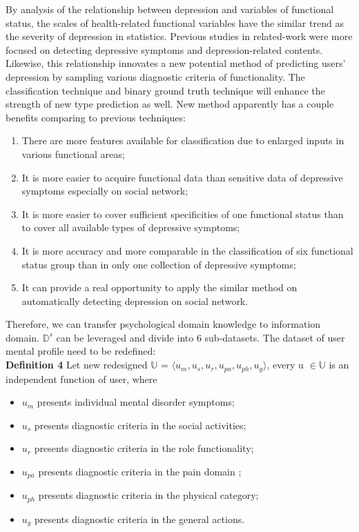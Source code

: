 \documentclass[10pt,journal,compsoc]{IEEEtran}
\begin{document}
By analysis of the relationship between depression and variables of functional status, the scales of health-related functional variables have the similar trend as the severity of depression in statistics. Previous studies in related-work were more focused on detecting depressive symptoms and depression-related contents. Likewise, this relationship innovates a new potential method of predicting users' depression by sampling various diagnostic criteria of functionality. The classification technique and binary ground truth technique will enhance the strength of new type prediction as well. New method apparently has a couple benefits comparing to previous techniques:
\begin{enumerate}[label=\alph*)]
  \item There are more features available for classification due to enlarged inputs in various functional areas;
  \item It is more easier to acquire functional data than sensitive data of depressive symptoms especially on social network; 
  \item It is more easier to cover sufficient specificities of one functional status than to cover all available types of depressive symptoms;
  \item It is more accuracy and more comparable in the classification of six functional status group than in only one collection of depressive symptoms;
  \item It can provide a real opportunity to apply the similar method on automatically detecting depression on social network.
\end{enumerate}

Therefore, we can transfer psychological domain knowledge to information domain. \textit{$\mathbb{D}^s$} can be leveraged and divide into 6 sub-datasets. The dataset of user mental profile need to be redefined:\\
\textbf{Definition 4} Let new redesigned $\mathbb{U}$ = $\langle u_{m}, u_{s}, u_{r}, u_{pa}, u_{ph}, u_{g} \rangle$, every u  $\in \mathbb{U}$ is an independent function of user, where
\begin{itemize}
  \item $u_{m}$ presents individual mental disorder symptoms;
  \item $u_{s}$ presents diagnostic criteria in the social activities;
  \item $u_{r}$ presents diagnostic criteria in the role functionality;
  \item $u_{pa}$ presents diagnostic criteria in the pain domain ;
  \item $u_{ph}$ presents diagnostic criteria in the physical category;
  \item $u_{g}$ presents diagnostic criteria in the general actions.
\end{itemize}
%
%
%
\end{document}
